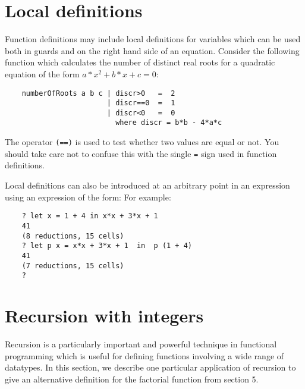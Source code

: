 \section{Local definitions}
Function definitions may include local definitions for variables  which
can be used both in guards and on the right hand side of  an  equation.
Consider the following function which calculates the number of distinct
real roots for a quadratic equation of the form $a*x^2+b*x+c=0$:
\begin{verbatim}
    numberOfRoots a b c | discr>0   =  2
                        | discr==0  =  1
                        | discr<0   =  0
                          where discr = b*b - 4*a*c
\end{verbatim}
The operator \verb"(==)" is used to test whether two values are  equal
or not.  You should take care not to confuse this with the  single  \verb"="
sign used in function definitions.

Local definitions can also be introduced at an arbitrary  point  in  an
expression using an expression of the form:
\BQ
       
\EQ
For example:
\begin{verbatim}
    ? let x = 1 + 4 in x*x + 3*x + 1
    41
    (8 reductions, 15 cells)
    ? let p x = x*x + 3*x + 1  in  p (1 + 4)
    41
    (7 reductions, 15 cells)
    ?
\end{verbatim}

\section{Recursion with integers}
Recursion  is  a  particularly  important  and  powerful  technique  in
functional programming which is useful for defining functions involving
a wide range of datatypes.  In this section, we describe one particular
application of recursion to give  an  alternative  definition  for  the
factorial function from section 5.

